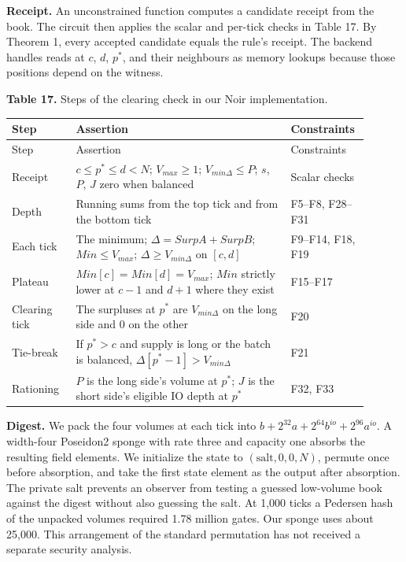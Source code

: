 \textbf{Receipt.} An unconstrained function computes a candidate receipt from the book. The circuit then applies the scalar and per-tick checks in Table 17. By Theorem 1, every accepted candidate equals the rule's receipt. The backend handles reads at \(c\), \(d\), \(p^*\), and their neighbours as memory lookups because those positions depend on the witness.

\textbf{Table 17.} Steps of the clearing check in our Noir implementation.

\begingroup
\setlength{\tabcolsep}{2pt}\small
\begin{longtable}{@{}>{\raggedright\arraybackslash}p{0.1710\linewidth}>{\raggedright\arraybackslash}p{0.5760\linewidth}>{\raggedright\arraybackslash}p{0.1530\linewidth}@{}}
\toprule
Step & Assertion & Constraints \\
\midrule\endfirsthead
\toprule
Step & Assertion & Constraints \\
\midrule\endhead
\bottomrule\endfoot
Receipt & \(c \le p^* \le d < N\); \(V_{max} \ge 1\); \(V_{min\Delta} \le P\); \(s\), \(P\), \(J\) zero when balanced & Scalar checks \\
Depth & Running sums from the top tick and from the bottom tick & F5--F8, F28--F31 \\
Each tick & The minimum; \(\Delta = SurpA + SurpB\); \(Min \le V_{max}\); \(\Delta \ge V_{min\Delta}\) on \([c,d]\) & F9--F14, F18, F19 \\
Plateau & \(Min[c] = Min[d] = V_{max}\); \(Min\) strictly lower at \(c - 1\) and \(d + 1\) where they exist & F15--F17 \\
Clearing tick & The surpluses at \(p^*\) are \(V_{min\Delta}\) on the long side and 0 on the other & F20 \\
Tie-break & If \(p^* > c\) and supply is long or the batch is balanced, \(\Delta[p^* - 1] > V_{min\Delta}\) & F21 \\
Rationing & \(P\) is the long side's volume at \(p^*\); \(J\) is the short side's eligible IO depth at \(p^*\) & F32, F33 \\
\end{longtable}
\endgroup

\textbf{Digest.} We pack the four volumes at each tick into \(b+2^{32}a+2^{64}b^{io}+2^{96}a^{io}\). A width-four Poseidon2 sponge with rate three and capacity one absorbs the resulting field elements. We initialize the state to \((\text{salt},0,0,N)\), permute once before absorption, and take the first state element as the output after absorption. The private salt prevents an observer from testing a guessed low-volume book against the digest without also guessing the salt. At 1,000 ticks a Pedersen hash of the unpacked volumes required 1.78 million gates. Our sponge uses about 25,000. This arrangement of the standard permutation has not received a separate security analysis.

